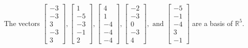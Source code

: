 \begin{exercise}
\begin{exerciseStatement}
  \end{exerciseStatement}
  \begin{exerciseAnswer}
   The vectors \(\left[\begin{array}{r}
-3 \\
-3 \\
3 \\
-3 \\
3
\end{array}\right] , \left[\begin{array}{r}
1 \\
-5 \\
-3 \\
-1 \\
2
\end{array}\right] , \left[\begin{array}{r}
4 \\
1 \\
-4 \\
-4 \\
-4
\end{array}\right] , \left[\begin{array}{r}
-2 \\
-3 \\
0 \\
-3 \\
4
\end{array}\right] , \text{ and } \left[\begin{array}{r}
-5 \\
-1 \\
-4 \\
3 \\
-1
\end{array}\right]\) 
  	 are  a basis of \(\mathbb{R}^5\).
  


  \end{exerciseAnswer}
\end{exercise}